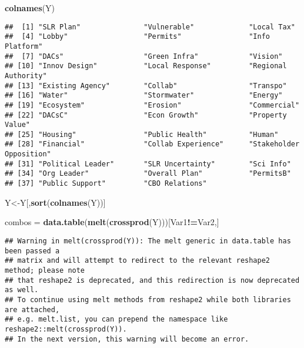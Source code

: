 \documentclass[
]{article}
\newenvironment{Shaded}{\begin{snugshade}}{\end{snugshade}}
\newcommand{\KeywordTok}[1]{\textcolor[rgb]{0.13,0.29,0.53}{\textbf{#1}}}
\newcommand{\NormalTok}[1]{#1}
\newcommand{\OperatorTok}[1]{\textcolor[rgb]{0.81,0.36,0.00}{\textbf{#1}}}
\newcommand{\StringTok}[1]{\textcolor[rgb]{0.31,0.60,0.02}{#1}}
\begin{document}
\begin{Shaded}
\begin{Highlighting}[]
\KeywordTok{colnames}\NormalTok{(Y)}
\end{Highlighting}
\end{Shaded}

\begin{verbatim}
##  [1] "SLR Plan"               "Vulnerable"             "Local Tax"             
##  [4] "Lobby"                  "Permits"                "Info Platform"         
##  [7] "DACs"                   "Green Infra"            "Vision"                
## [10] "Innov Design"           "Local Response"         "Regional Authority"    
## [13] "Existing Agency"        "Collab"                 "Transpo"               
## [16] "Water"                  "Stormwater"             "Energy"                
## [19] "Ecosystem"              "Erosion"                "Commercial"            
## [22] "DACsC"                  "Econ Growth"            "Property Value"        
## [25] "Housing"                "Public Health"          "Human"                 
## [28] "Financial"              "Collab Experience"      "Stakeholder Opposition"
## [31] "Political Leader"       "SLR Uncertainty"        "Sci Info"              
## [34] "Org Leader"             "Overall Plan"           "PermitsB"              
## [37] "Public Support"         "CBO Relations"
\end{verbatim}

\begin{Shaded}
\begin{Highlighting}[]
\NormalTok{Y\textless{}{-}Y[,}\KeywordTok{sort}\NormalTok{(}\KeywordTok{colnames}\NormalTok{(Y))]}

\NormalTok{combos =}\StringTok{ }\KeywordTok{data.table}\NormalTok{(}\KeywordTok{melt}\NormalTok{(}\KeywordTok{crossprod}\NormalTok{(Y)))[Var1}\OperatorTok{!=}\NormalTok{Var2,]}
\end{Highlighting}
\end{Shaded}

\begin{verbatim}
## Warning in melt(crossprod(Y)): The melt generic in data.table has been passed a
## matrix and will attempt to redirect to the relevant reshape2 method; please note
## that reshape2 is deprecated, and this redirection is now deprecated as well.
## To continue using melt methods from reshape2 while both libraries are attached,
## e.g. melt.list, you can prepend the namespace like reshape2::melt(crossprod(Y)).
## In the next version, this warning will become an error.
\end{verbatim}
\end{document}
